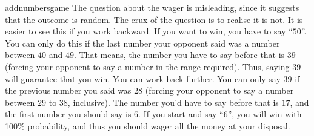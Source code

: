 \begin{answer}{addnumbersgame}
The question about the wager is misleading, since it suggests that the outcome is random.
The crux of the question is to realise it is not.
It is easier to see this if you work backward.
If you want to win, you have to say ``$50$''.
You can only do this if the last number your opponent said was a number between $40$ and $49$.
That means, the number you have to say before that is $39$ (forcing your opponent to say a number in the range required).
Thus, saying $39$ will guarantee that you win.
You can work back further.
You can only say $39$ if the previous number you said was $28$ (forcing your opponent to say a number between $29$ to $38$, inclusive).
The number you'd have to say before that is $17$, and the first number you should say is $6$.
If you start and say ``$6$'', you will win with 100\% probability, and thus you should wager all the money at your disposal.
\end{answer}
